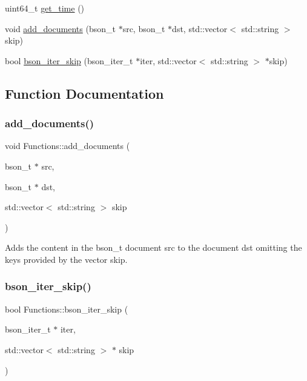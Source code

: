 \begin{DoxyCompactItemize}
\item 
uint64\+\_\+t \hyperlink{namespace_functions_a0f3325eb8b88e73ff76e558290d3b346}{get\+\_\+time} ()
\item 
void \hyperlink{namespace_functions_ae254385436f80c3069a0a2f74df4d741}{add\+\_\+documents} (bson\+\_\+t $\ast$src, bson\+\_\+t $\ast$dst, std\+::vector$<$ std\+::string $>$ skip)
\item 
bool \hyperlink{namespace_functions_a7948d719f3f38161f1fe1572072224bc}{bson\+\_\+iter\+\_\+skip} (bson\+\_\+iter\+\_\+t $\ast$iter, std\+::vector$<$ std\+::string $>$ $\ast$skip)
\end{DoxyCompactItemize}


\subsection{Function Documentation}
\mbox{\label{namespace_functions_ae254385436f80c3069a0a2f74df4d741}} 
\subsubsection{\texorpdfstring{add\+\_\+documents()}{add\_documents()}}
{\footnotesize\ttfamily void Functions\+::add\+\_\+documents (\begin{DoxyParamCaption}\item[{bson\+\_\+t $\ast$}]{src,  }\item[{bson\+\_\+t $\ast$}]{dst,  }\item[{std\+::vector$<$ std\+::string $>$}]{skip }\end{DoxyParamCaption})}

Adds the content in the bson\+\_\+t document src to the document dst omitting the keys provided by the vector skip. \mbox{\label{namespace_functions_a7948d719f3f38161f1fe1572072224bc}} 
\subsubsection{\texorpdfstring{bson\+\_\+iter\+\_\+skip()}{bson\_iter\_skip()}}
{\footnotesize\ttfamily bool Functions\+::bson\+\_\+iter\+\_\+skip (\begin{DoxyParamCaption}\item[{bson\+\_\+iter\+\_\+t $\ast$}]{iter,  }\item[{std\+::vector$<$ std\+::string $>$ $\ast$}]{skip }\end{DoxyParamCaption})}

